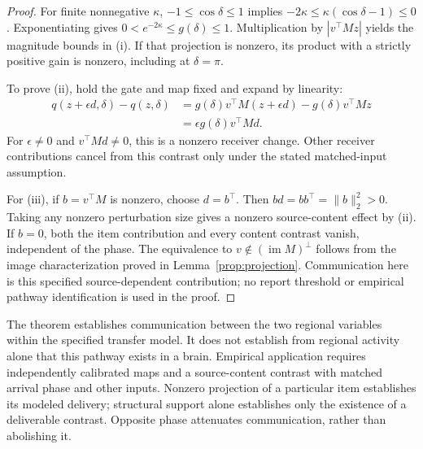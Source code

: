 \documentclass[submission,nolinenumbers]{esj}
\DeclareMathOperator{\im}{im}
\begin{document}
\begin{proof}
For finite nonnegative $\kappa$, $-1\le\cos\delta\le1$ implies $-2\kappa\le\kappa(\cos\delta-1)\le0$. Exponentiating gives $0<e^{-2\kappa}\le g(\delta)\le1$. Multiplication by $|v^\top Mz|$ yields the magnitude bounds in (i). If that projection is nonzero, its product with a strictly positive gain is nonzero, including at $\delta=\pi$.

To prove (ii), hold the gate and map fixed and expand by linearity:
\begin{align*}
q(z+\epsilon d,\delta)-q(z,\delta)
&=g(\delta)v^\top M(z+\epsilon d)-g(\delta)v^\top Mz\\
&=\epsilon g(\delta)v^\top Md.
\end{align*}
For $\epsilon\ne0$ and $v^\top Md\ne0$, this is a nonzero receiver change. Other receiver contributions cancel from this contrast only under the stated matched-input assumption.

For (iii), if $b=v^\top M$ is nonzero, choose $d=b^\top$. Then $bd=bb^\top=\|b\|_2^2>0$. Taking any nonzero perturbation size gives a nonzero source-content effect by (ii). If $b=0$, both the item contribution and every content contrast vanish, independent of the phase. The equivalence to $v\notin(\im M)^\perp$ follows from the image characterization proved in Lemma~\ref{prop:projection}. Communication here is this specified source-dependent contribution; no report threshold or empirical pathway identification is used in the proof.
\end{proof}
The theorem establishes communication between the two regional variables within the specified transfer model. It does not establish from regional activity alone that this pathway exists in a brain. Empirical application requires independently calibrated maps and a source-content contrast with matched arrival phase and other inputs. Nonzero projection of a particular item establishes its modeled delivery; structural support alone establishes only the existence of a deliverable contrast. Opposite phase attenuates communication, rather than abolishing it.
\end{document}
